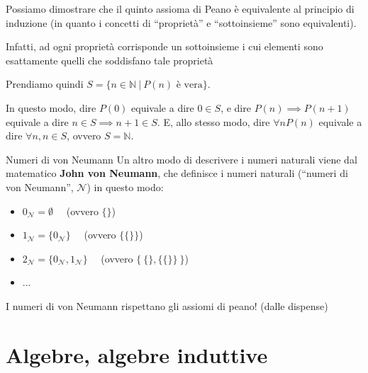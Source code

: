 \documentclass[a4paper,11pt]{report}
\begin{document}
Possiamo dimostrare che il quinto assioma di Peano è equivalente al principio di induzione (in quanto i concetti di ``proprietà'' e ``sottoinsieme'' sono equivalenti).

Infatti, ad ogni proprietà corrisponde un sottoinsieme i cui elementi sono esattamente quelli che soddisfano tale proprietà

Prendiamo quindi \( S = \{n \in \mathbb{N} \ | \ P(n) \text{ è vera}\}\).

In questo modo, dire \( P(0) \) equivale a dire \( 0 \in S \), e dire \( P(n) \implies P(n+1) \) equivale a dire \( n \in S \implies n+1 \in S \). E, allo stesso modo, dire \( \forall n P(n) \) equivale a dire \( \forall n, n \in S\), ovvero \(S = \mathbb{N} \).


\begin{defbox}{Numeri di von Neumann}{}
    Un altro modo di descrivere i numeri naturali viene dal matematico \textbf{John von Neumann}, che definisce i numeri naturali (``numeri di von Neumann'', \( \mathcal{N} \)) in questo modo:

    \begin{itemize}
        \item \(  0_\mathcal{N} = \emptyset\)  \ \ {\color{gray}(ovvero \( \{ \} \))}

        \item \( 1_\mathcal{N} = \{ 0_\mathcal{N}\}\) \ \ {\color{gray}(ovvero \( \{ \{\}\} \))}
        \item \( 2_\mathcal{N} = \{ 0_\mathcal{N}, 1_\mathcal{N}\}\) \ \ {\color{gray}(ovvero \( \{ \ \{\}, \{\{\}\} \ \}  \))}
        \item ...

    \end{itemize}

    I numeri di von Neumann rispettano gli assiomi di peano! (dalle dispense)

\end{defbox}

\section{Algebre, algebre induttive}
\end{document}
